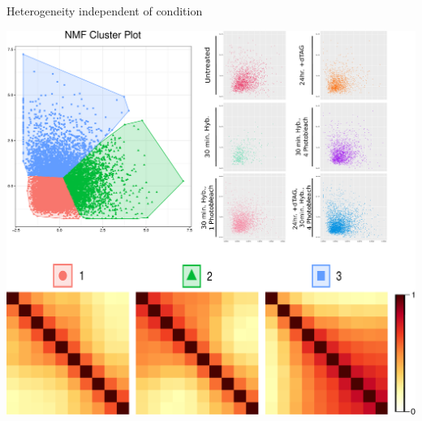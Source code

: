 \documentclass[landscape,a0paper,fontscale=0.285]{baposter} %
\begin{document}
\begin{poster}
\begin{posterbox}[name=section07, column=2, below=section06, height=0.5, above=bottom]{Heterogeneity independent of condition}
\begin{center}
\includegraphics[width=0.9\linewidth, height=250\lineheight]{allSamples_bySample_clusPlot_NMF_matrices.pdf}
\end{center}
\end{posterbox}


\end{poster}
\end{document}
